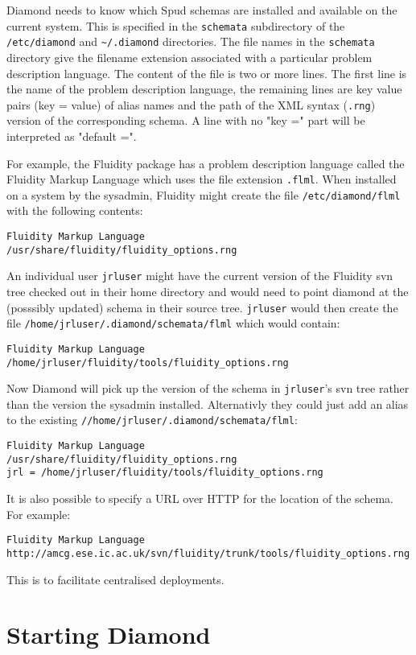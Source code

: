 Diamond needs to know which Spud schemas are installed and available on the
current system. This is specified in the \verb+schemata+ subdirectory of the
\verb+/etc/diamond+ and \verb+~/.diamond+ directories. The file names in the
\verb+schemata+ directory give the filename extension associated with a
particular problem description language. The content of the file is two or
more lines. The first line is the name of the problem description language,
the remaining lines are key value pairs (key = value) of alias names and the 
path of the XML syntax (\verb+.rng+) version of the corresponding schema.
A line with no "key =" part will be interpreted as "default =".

For example, the Fluidity package has a problem description language called
the Fluidity Markup Language which uses the file extension
\verb+.flml+. When installed on a system by the sysadmin, Fluidity might
create the file \verb+/etc/diamond/flml+ with the following contents:
\begin{verbatim}
Fluidity Markup Language
/usr/share/fluidity/fluidity_options.rng
\end{verbatim}
An individual user \verb+jrluser+ might have the current version of the
Fluidity svn tree checked out in their home directory and would need to
point diamond at the (posssibly updated) schema in their source
tree. \verb+jrluser+ would then create the file
\verb+/home/jrluser/.diamond/schemata/flml+ which would contain:
\begin{verbatim}
Fluidity Markup Language
/home/jrluser/fluidity/tools/fluidity_options.rng
\end{verbatim}
Now Diamond will pick up the version of the schema in \verb+jrluser+'s svn
tree rather than the version the sysadmin installed.
Alternativly they could just add an alias to the existing \verb+//home/jrluser/.diamond/schemata/flml+:
\begin{verbatim}
Fluidity Markup Language
/usr/share/fluidity/fluidity_options.rng
jrl = /home/jrluser/fluidity/tools/fluidity_options.rng
\end{verbatim}

It is also possible to specify a URL over HTTP for the location of the
schema. For example:
\begin{verbatim}
Fluidity Markup Language
http://amcg.ese.ic.ac.uk/svn/fluidity/trunk/tools/fluidity_options.rng
\end{verbatim}
This is to facilitate centralised deployments.

\section{Starting Diamond}

